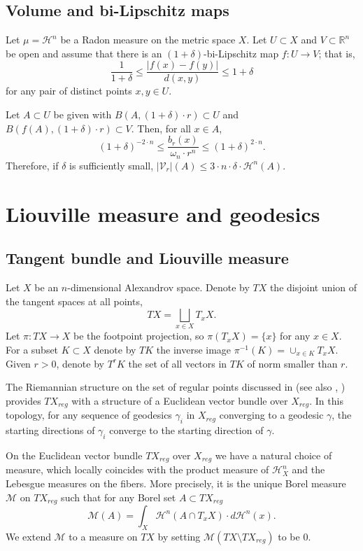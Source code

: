 \documentclass[12pt,leqno,intlimits]{amsart}
\numberwithin{equation}{section}
\theoremstyle{definition}
\theoremstyle{remark}
\newcommand{\R}{\mathbb{R}}
\def\:{\colon}
\begin{document}
\subsection{Volume and bi-Lipschitz maps}
Let $\mu =\mathcal H^n$ be a Radon measure on the metric space $X$.
Let $U\subset X$ and $V\subset \R^n$ be open and assume that there is an $(1+\delta)$-bi-Lipschitz map $f\:U \to V$;
that is,
\[\frac1{1+\delta}\le\frac{|f(x)-f(y)|}{d(x,y)}\le 1+\delta\]
for any pair of distinct points $x,y\in U$.

Let $A\subset U$ be given with
$B (A,{(1+\delta) \cdot r}) \subset U$ and $B (f(A),{(1+\delta) \cdot r}) \subset V$. Then, for all $x\in A$,
\begin{equation} \label{eq:bilip}
(1+\delta) ^{-2\cdot n} \leq \frac {b_r(x)} {\omega _n \cdot r^n} \leq (1+\delta ) ^{2\cdot n}.
\end{equation}
Therefore, if $\delta $ is sufficiently small, $|\mathcal{V}_r | (A) \leq 3\cdot  n \cdot \delta \cdot \mathcal H^n (A).$

\section{Liouville measure and geodesics} \label{sec:Liou}
\subsection{Tangent bundle and Liouville measure} \label{subsec:tb}
Let $X$ be an $n$-dimensional Alexandrov space.
Denote by $TX$ the disjoint union of the tangent spaces at all points,
\[TX=\bigsqcup_{x\in X} T_x X.\]
Let $\pi\:TX\to X$ be the footpoint projection, so $\pi (T_xX)=\{x\}$ for any $x\in X$. %
For a subset $K\subset X$ denote by $TK$ the inverse image $\pi^{-1} (K)= \cup _{x\in K} T_xX$. %
Given $r>0$, denote by $T^r K$ the set of all vectors in $TK$ of norm smaller than $r$.


The Riemannian structure on the set of regular points discussed in \cite{Otsu-Shioya} (see also \cite{Shioya}, \cite{Per-DC}) provides $TX_{reg}$ with a structure of a Euclidean vector bundle over $X_{reg}$. In this topology, for any sequence of geodesics $\gamma _i$ in $X_{reg}$ converging to a geodesic $\gamma$, the starting directions of $\gamma _i$ converge to the starting direction of $\gamma$.

On the Euclidean vector bundle $TX_{reg}$ over $X_{reg}$ we have a natural choice of measure, which locally coincides with the product measure of $\mathcal H^n _X$ and the Lebesgue measures on the fibers. More precisely,
it is the unique Borel measure $\mathcal M$ on $TX_{reg}$ such that for any Borel set $A\subset TX_{reg}$
$$\mathcal M(A)= \int _X \mathcal H^n(A \cap T_x X) \cdot d\mathcal H^n (x).$$
We extend $\mathcal M$ to a measure on $TX$ by setting $\mathcal M(TX\setminus TX_{reg})$ to be $0$.
\end{document}
